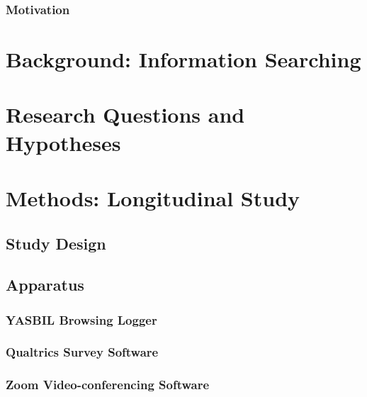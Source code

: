 \documentclass[letterpaper, nobind]{templates/ociamthesis}
\begin{document}
\hypertarget{motivation}{%
\subsection{Motivation}\label{motivation}}

\hypertarget{ch_bg_search}{%
\chapter{Background: Information Searching}\label{ch_bg_search}}

\hypertarget{research-questions-and-hypotheses}{%
\chapter{Research Questions and Hypotheses}\label{research-questions-and-hypotheses}}

\hypertarget{methods-longitudinal-study}{%
\chapter{Methods: Longitudinal Study}\label{methods-longitudinal-study}}

\hypertarget{sec-method-exp-design}{%
\section{Study Design}\label{sec-method-exp-design}}

\hypertarget{apparatus}{%
\section{Apparatus}\label{apparatus}}

\hypertarget{yasbil-browsing-logger}{%
\subsection{YASBIL Browsing Logger}\label{yasbil-browsing-logger}}

\hypertarget{qualtrics-survey-software}{%
\subsection{Qualtrics Survey Software}\label{qualtrics-survey-software}}

\hypertarget{zoom-video-conferencing-software}{%
\subsection{Zoom Video-conferencing Software}\label{zoom-video-conferencing-software}}
\end{document}
